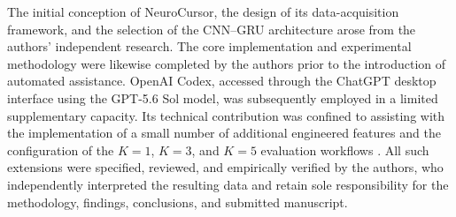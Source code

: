 \documentclass[conference]{IEEEtran}
\begin{document}
The initial conception of NeuroCursor, the design of its data-acquisition framework, and the selection of the CNN--GRU architecture arose from the authors' independent research. The core implementation and experimental methodology were likewise completed by the authors prior to the introduction of automated assistance. OpenAI Codex, accessed through the ChatGPT desktop interface using the GPT-5.6 Sol model, was subsequently employed in a limited supplementary capacity. Its technical contribution was confined to assisting with the implementation of a small number of additional engineered features and the configuration of the $K=1$, $K=3$, and $K=5$ evaluation workflows \cite{openaiCodexModels}. All such extensions were specified, reviewed, and empirically verified by the authors, who independently interpreted the resulting data and retain sole responsibility for the methodology, findings, conclusions, and submitted manuscript.

\FloatBarrier
\end{document}
